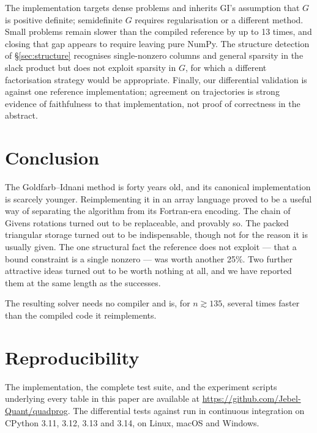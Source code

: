 \documentclass[11pt,a4paper]{article}
\theoremstyle{plain}
\theoremstyle{remark}
\begin{document}
The implementation targets dense problems and inherits GI's assumption that $G$
is positive definite; semidefinite $G$ requires regularisation or a different
method. Small problems remain slower than the compiled reference by up to
13 times, and closing that gap appears to require leaving pure NumPy. The structure detection of \S\ref{sec:structure}
recognises single-nonzero columns and general sparsity in the slack product but
does not exploit sparsity in $G$, for which a different factorisation strategy
would be appropriate. Finally, our differential validation is against one
reference implementation; agreement on trajectories is strong evidence of
faithfulness to that implementation, not proof of correctness in the abstract.

\section{Conclusion}

The Goldfarb--Idnani method is forty years old, and its canonical
implementation is scarcely younger. Reimplementing it in an array language proved to be a useful
way of separating the algorithm from its Fortran-era encoding. The chain of
Givens rotations turned out to be replaceable, and provably so. The packed
triangular storage turned out to be indispensable, though not for the reason it
is usually given. The one structural fact the reference does not exploit --- that
a bound constraint is a single nonzero --- was worth another 25\%.
Two further attractive ideas turned out to be worth nothing at all, and we have
reported them at the same length as the successes.

The resulting solver needs no compiler and is, for $n \gtrsim 135$, several times
faster than the compiled code it reimplements.

\section*{Reproducibility}

The implementation, the complete test suite, and the experiment scripts
underlying every table in this paper are available at
\url{https://github.com/Jebel-Quant/quadprog}. The differential tests against
\citep{quadprogpy} run in continuous integration on CPython 3.11, 3.12, 3.13 and
3.14, on Linux, macOS and Windows.



\end{document}

